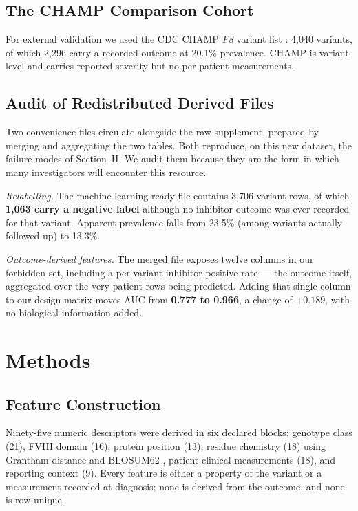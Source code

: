 \documentclass[conference]{IEEEtran}
\begin{document}
\subsection{The CHAMP Comparison Cohort}
For external validation we used the CDC CHAMP \textit{F8} variant list
\cite{champ}: 4{,}040 variants, of which 2{,}296 carry a recorded outcome at
20.1\% prevalence. CHAMP is variant-level and carries reported severity but no
per-patient measurements.

\subsection{Audit of Redistributed Derived Files}
Two convenience files circulate alongside the raw supplement, prepared by
merging and aggregating the two tables. Both reproduce, on this new dataset,
the failure modes of Section~II. We audit them because they are the form in
which many investigators will encounter this resource.

\textit{Relabelling.} The machine-learning-ready file contains 3{,}706 variant
rows, of which \textbf{1{,}063 carry a negative label} although no inhibitor
outcome was ever recorded for that variant. Apparent prevalence falls from
23.5\% (among variants actually followed up) to 13.3\%.

\textit{Outcome-derived features.} The merged file exposes twelve columns in
our forbidden set, including a per-variant inhibitor positive rate --- the
outcome itself, aggregated over the very patient rows being predicted. Adding
that single column to our design matrix moves AUC from \textbf{0.777 to
0.966}, a change of $+0.189$, with no biological information added.

\section{Methods}

\subsection{Feature Construction}
Ninety-five numeric descriptors were derived in six declared blocks: genotype
class (21), FVIII domain (16), protein position (13), residue chemistry (18)
using Grantham distance \cite{grantham} and BLOSUM62 \cite{blosum}, patient
clinical measurements (18), and reporting context (9). Every feature is either
a property of the variant or a measurement recorded at diagnosis; none is
derived from the outcome, and none is row-unique.
\end{document}
